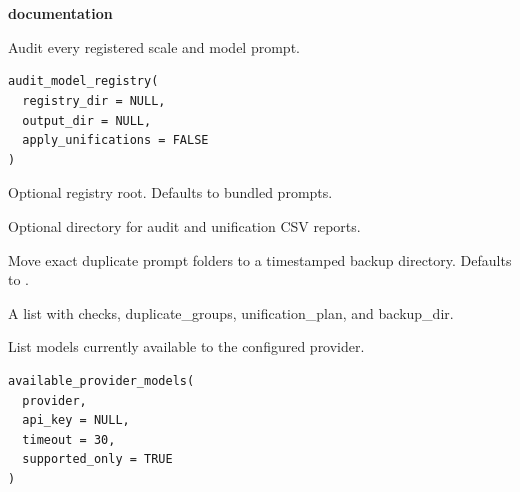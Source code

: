 \documentclass[a4paper]{book}
\begin{document}
\chapter*{}
\begin{center}
{\textbf{\huge \R{} documentation}} \par{}
\par\bigskip{\large \today}
\end{center}
%
\begin{Description}
Audit every registered scale and model prompt.
\end{Description}
%
\begin{Usage}
\begin{verbatim}
audit_model_registry(
  registry_dir = NULL,
  output_dir = NULL,
  apply_unifications = FALSE
)
\end{verbatim}
\end{Usage}
%
\begin{Arguments}
\begin{ldescription}
\item[\code{registry\_dir}] Optional registry root. Defaults to bundled prompts.

\item[\code{output\_dir}] Optional directory for audit and unification CSV reports.

\item[\code{apply\_unifications}] Move exact duplicate prompt folders to a timestamped
backup directory. Defaults to .
\end{ldescription}
\end{Arguments}
%
\begin{Value}
A list with checks, duplicate\_groups, unification\_plan, and backup\_dir.
\end{Value}
%
\begin{Description}
List models currently available to the configured provider.
\end{Description}
%
\begin{Usage}
\begin{verbatim}
available_provider_models(
  provider,
  api_key = NULL,
  timeout = 30,
  supported_only = TRUE
)
\end{verbatim}
\end{Usage}
\end{document}
